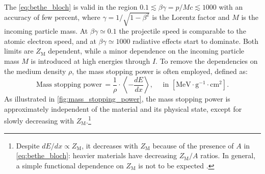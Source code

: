 The \autoref{eq:bethe_bloch} is valid in the region $0.1\lesssim\beta\gamma=p/Mc\lesssim1000$ with an accuracy of few percent, where $\gamma=1/\sqrt{1-\beta^2}$ is the Lorentz factor and $M$ is the incoming particle mass. At $\beta\gamma\simeq0.1$ the projectile speed is comparable to the atomic electron speed, and at $\beta\gamma\simeq1000$ radiative effects start to dominate. Both limits are $Z_\text{M}$ dependent, while a minor dependence on the incoming particle mass $M$ is introduced at high energies through $I$. To remove the dependencies on the medium density $\rho$, the mass stopping power is often employed, defined as:
\begin{equation}
	\text{Mass stopping power}\,=\frac{1}{\rho}\cdot\left\langle-\frac{dE}{dx} \right\rangle,\quad\text{ in }[\text{MeV}\cdot\text{g}^{-1}\cdot\text{cm}^2].
	\label{eq:mass_stopping_power}
\end{equation}
As illustrated in \autoref{fig:mass_stopping_power}, the mass stopping power is approximately independent of the material and its physical state, except for slowly decreasing with $Z_\text{M}$.\footnote{Despite $dE/dx\propto Z_\text{M}$, it decreases with $Z_\text{M}$ because of the presence of $A$ in \autoref{eq:bethe_bloch}: heavier materials have decreasing $Z_\text{M}/A$ ratios. In general, a simple functional dependence on $Z_\text{M}$ is not to be expected \cite{passageParticleMatter}.}
